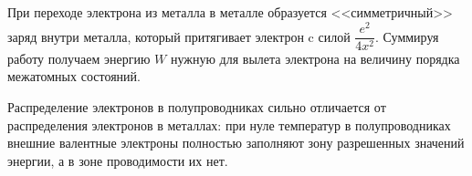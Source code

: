 \documentclass[a4paper,12pt]{article}
\begin{document}
		При переходе электрона из металла в металле образуется <<симметричный>> заряд внутри металла, который притягивает электрон c силой $\dfrac{e^2}{4x^2}$. Суммируя работу получаем энергию $W$ нужную для вылета электрона на  величину порядка межатомных состояний.
		
		\begin{figure}[h]
				\begin{minipage}[h]{0.6\linewidth}
				\end{minipage}
				\hfill
				\hfill
				\begin{minipage}[h]{0.6\linewidth}
				\end{minipage}
			\end{figure}
		Распределение электронов в полупроводниках сильно отличается от распределения электронов в металлах: при нуле температур в полупроводниках внешние валентные электроны полностью заполняют зону разрешенных значений энергии, а в зоне проводимости их нет.
		
\end{document}
